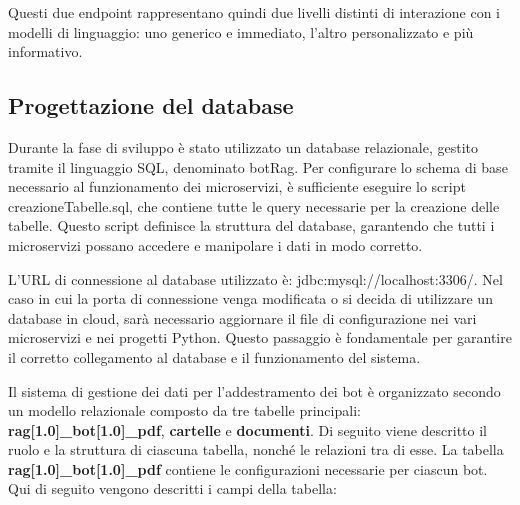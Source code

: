 \documentclass[a4paper,twoside,12pt]{toptesi}
\begin{document}
Questi due endpoint rappresentano quindi due livelli distinti di interazione con i modelli di linguaggio: uno generico e immediato, l'altro personalizzato e più informativo.

\subsection{Progettazione del database}
Durante la fase di sviluppo è stato utilizzato un database relazionale, gestito tramite il linguaggio SQL, denominato botRag. Per configurare lo schema di base necessario al funzionamento dei microservizi, è sufficiente eseguire lo script creazioneTabelle.sql, che contiene tutte le query necessarie per la creazione delle tabelle. Questo script definisce la struttura del database, garantendo che tutti i microservizi possano accedere e manipolare i dati in modo corretto. 

L'URL di connessione al database utilizzato è: jdbc:mysql://localhost:3306/. Nel caso in cui la porta di connessione venga modificata o si decida di utilizzare un database in cloud, sarà necessario aggiornare il file di configurazione nei vari microservizi e nei progetti Python. Questo passaggio è fondamentale per garantire il corretto collegamento al database e il funzionamento del sistema.
\\


Il sistema di gestione dei dati per l'addestramento dei bot è organizzato secondo un modello relazionale composto da tre tabelle principali: \textbf{rag\scalebox{0.5}[1.0]{\_}bot\scalebox{0.5}[1.0]{\_}pdf}, \textbf{cartelle} e \textbf{documenti}. Di seguito viene descritto il ruolo e la struttura di ciascuna tabella, nonché le relazioni tra di esse. La tabella \textbf{rag\scalebox{0.5}[1.0]{\_}bot\scalebox{0.5}[1.0]{\_}pdf} contiene le configurazioni necessarie per ciascun bot. Qui di seguito vengono descritti i campi della tabella:
\end{document}
